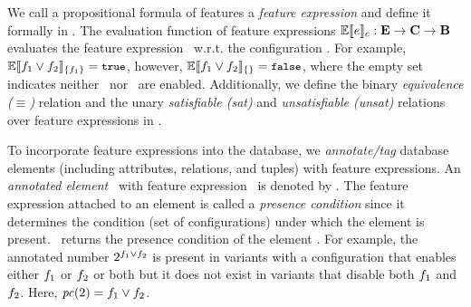 We call a propositional formula of features a \emph{feature expression} and define
it formally in . 
The evaluation function of feature expressions 
$\fSem \dimMeta : \ffSet \to \confSet \to \bSet$ evaluates the 
feature expression \dimMeta\ w.r.t. the configuration \config.
For example, $\fSem [\{\A\}] {\A \vee \B} = \t$, however,
$\fSem [\{\}] {\A \vee \B} = \f$, where the empty set indicates neither \A\ nor \B\
are enabled.
Additionally, we define the binary \emph{equivalence ($\equiv$)} relation and
the unary \emph{satisfiable (sat)} and \emph{unsatisfiable (unsat)}
relations over feature expressions in \figref{fexp-def}.
%

To incorporate feature expressions into the database,
we \emph{annotate/tag} database elements (including attributes, relations, and tuples) 
with feature expressions. An \emph{annotated element} \elem\ with feature expression \dimMeta\
is denoted by \annot \elem. 
%
The feature expression attached to an element is called a \emph{presence condition}
since it determines the condition (set of configurations) under which the element is present.
\getPC \elem\ returns the presence condition of the element
\elem.
For example, the
annotated number $2^{\A \vee \B}$ is present in variants with a configuration
that enables either $\A$ or $\B$ or both
but it does not exist in variants that disable both $\A$ and $\B$.
Here, $\getPC {2} = \A \vee \B$.

